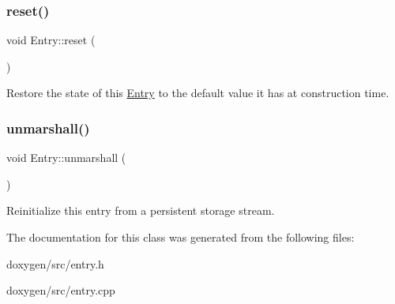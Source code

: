 \subsubsection{\texorpdfstring{reset()}{reset()}}
{\footnotesize\ttfamily void Entry\+::reset (\begin{DoxyParamCaption}{ }\end{DoxyParamCaption})}

Restore the state of this \mbox{\hyperlink{class_entry}{Entry}} to the default value it has at construction time. \mbox{\label{class_entry_a0c2561181c63aad06955b06211667683}} 
\subsubsection{\texorpdfstring{unmarshall()}{unmarshall()}}
{\footnotesize\ttfamily void Entry\+::unmarshall (\begin{DoxyParamCaption}\item[{\mbox{\hyperlink{class_storage_intf}{Storage\+Intf}} $\ast$}]{ }\end{DoxyParamCaption})}

Reinitialize this entry from a persistent storage stream. 

The documentation for this class was generated from the following files\+:\begin{DoxyCompactItemize}
\item 
doxygen/src/entry.\+h\item 
doxygen/src/entry.\+cpp\end{DoxyCompactItemize}
